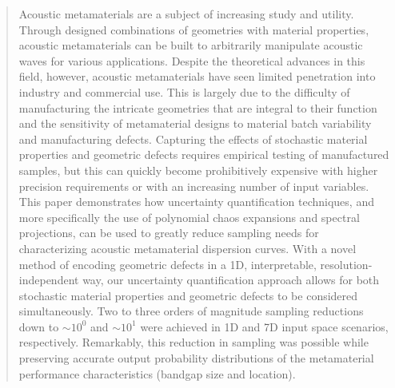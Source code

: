 \documentclass[preprint,review,12pt]{elsarticle}
\begin{document}
\begin{frontmatter}
\author[Mech]{Han Zhang}
\author[Mech]{Rayehe Karimi Mahabadi}
\author[Comp]{Cynthia Rudin}
\author[Mech]{Johann Guilleminot}
\author[Mech]{L. Catherine Brinson}
\begin{abstract}
Acoustic metamaterials are a subject of increasing study and utility. Through designed combinations of geometries with material properties, acoustic metamaterials can be built to arbitrarily manipulate acoustic waves for various applications. Despite the theoretical advances in this field, however, acoustic metamaterials have seen limited penetration into industry and commercial use. This is largely due to the difficulty of manufacturing the intricate geometries that are integral to their function and the sensitivity of metamaterial designs to material batch variability and manufacturing defects. Capturing the effects of stochastic material properties and geometric defects requires empirical testing of manufactured samples, but this can quickly become prohibitively expensive with higher precision requirements or with an increasing number of input variables. This paper demonstrates how uncertainty quantification techniques, and more specifically the use of polynomial chaos expansions and spectral projections, can be used to greatly reduce sampling needs for characterizing acoustic metamaterial dispersion curves. With a novel method of encoding geometric defects in a 1D, interpretable, resolution-independent way, our uncertainty quantification approach allows for both stochastic material properties and geometric defects to be considered simultaneously. Two to three orders of magnitude sampling reductions down to $\sim10^0$ and $\sim10^1$ were achieved in 1D and 7D input space scenarios, respectively. Remarkably, this reduction in sampling was possible while preserving accurate output probability distributions of the metamaterial performance characteristics (bandgap size and location).
\end{abstract}


\end{frontmatter}
\end{document}
